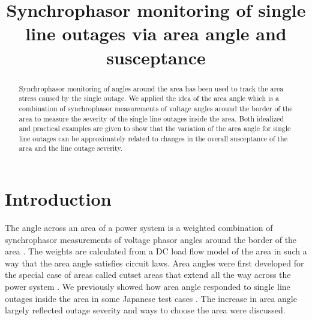 \documentclass[conference]{IEEEtran}
\begin{document}
\title{\Large \bf Synchrophasor monitoring of single line outages via area angle and susceptance}
\author{
}
\renewcommand{\headrulewidth}{ 0.0pt}

     




\maketitle

\thispagestyle{fancy}
\begin{abstract}  
Synchrophasor monitoring of angles around the area has been used to track the area stress caused by the single outage. We applied the idea of the area angle which is a combination of
 synchrophasor measurements of voltage angles around the border of the area to measure the severity of the single line outages inside the area. 
Both idealized and practical examples are given to show that 
the variation of the area angle for single line outages can be approximately related to changes in the overall susceptance of the area 
and the line outage severity. 
\end{abstract}



\section{Introduction}
\label{intro}

The  angle across an area of a power system  is a weighted combination of synchrophasor measurements of voltage phasor angles around the border of the area \cite{DobsonvoltPS12,DobsonIREP10}.
 The weights are  calculated from a DC load flow model of the area in such a way that 
 the area angle satisfies circuit laws.
 Area angles were first developed for the special case of areas called cutset areas that extend all the way across the power system
  \cite{DobsonHICSS10,DobsonPESGM10,LopezPESGM12}.
We previously showed how area angle responded to single line outages inside the area in some Japanese test cases \cite{DarvishiNAPS13}.
 The increase in area angle largely reflected outage severity and ways to choose the area were discussed.
 
\end{document}

